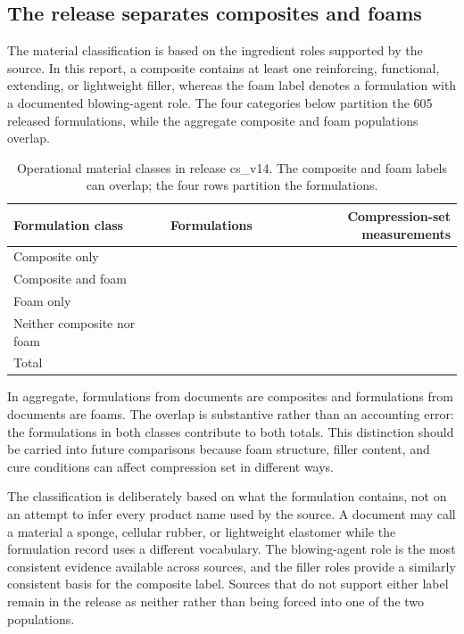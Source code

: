 \documentclass[10pt]{article}
\newcommand{\release}{cs\_v14}
\begin{document}
\subsection{The release separates composites and foams}
The material classification is based on the ingredient roles supported by the
source. In this report, a composite contains at least one reinforcing,
functional, extending, or lightweight filler, whereas the foam label denotes a
formulation with a documented blowing-agent role. The four categories below
partition the 605 released formulations, while the aggregate composite and
foam populations overlap.

\begin{table}[h]
\centering\small
\caption{Operational material classes in release \release. The composite and
foam labels can overlap; the four rows partition the formulations.}
\begin{tabular}{@{}lrr@{}}
\toprule
Formulation class & Formulations & Compression-set measurements \\
\midrule
Composite only & \nCompositeOnlyForms{} & \nCompositeOnlyRows{} \\
Composite and foam & \nCompositeFoamForms{} & \nCompositeFoamRows{} \\
Foam only & \nFoamOnlyForms{} & \nFoamOnlyRows{} \\
Neither composite nor foam & \nNeitherForms{} & \nNeitherRows{} \\
\midrule
Total & \nRelForms{} & \nRelRows{} \\
\bottomrule
\end{tabular}
\end{table}

In aggregate, \nCompositeForms{} formulations from \nCompositeDocs{} documents
are composites and \nFoamForms{} formulations from \nFoamDocs{} documents are
foams. The overlap is substantive rather than an accounting error: the
\nCompositeFoamForms{} formulations in both classes contribute to both totals.
This distinction should be carried into future comparisons because foam
structure, filler content, and cure conditions can affect compression set in
different ways.

The classification is deliberately based on what the formulation contains,
not on an attempt to infer every product name used by the source. A document
may call a material a sponge, cellular rubber, or lightweight elastomer while
the formulation record uses a different vocabulary. The blowing-agent role is
the most consistent evidence available across sources, and the filler roles
provide a similarly consistent basis for the composite label. Sources that do
not support either label remain in the release as neither rather than being
forced into one of the two populations.
\end{document}
